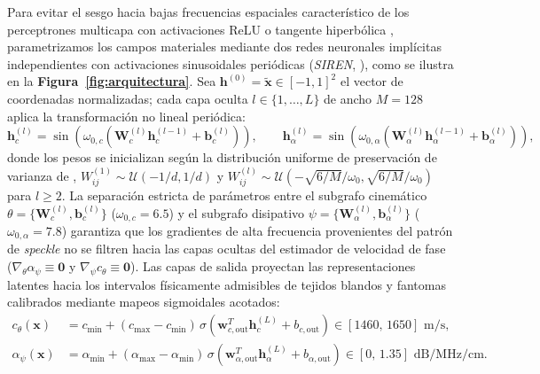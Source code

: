 \documentclass[9pt]{article}
\begin{document}
Para evitar el sesgo hacia bajas frecuencias espaciales característico de los perceptrones multicapa con activaciones ReLU o tangente hiperbólica \parencite{Tancik2020, Wang2021}, parametrizamos los campos materiales mediante dos redes neuronales implícitas independientes con activaciones sinusoidales periódicas (\textit{SIREN}, \cite{Sitzmann2020}), como se ilustra en la \textbf{Figura~\ref{fig:arquitectura}}. Sea $\mathbf{h}^{(0)} = \tilde{\mathbf{x}} \in [-1, 1]^2$ el vector de coordenadas normalizadas; cada capa oculta $l \in \{1, \dots, L\}$ de ancho $M = 128$ aplica la transformación no lineal periódica:
\begin{equation}
\mathbf{h}_c^{(l)} = \sin\!\left(\omega_{0,c}\left(\mathbf{W}_c^{(l)}\mathbf{h}_c^{(l-1)} + \mathbf{b}_c^{(l)}\right)\right), \qquad \mathbf{h}_\alpha^{(l)} = \sin\!\left(\omega_{0,\alpha}\left(\mathbf{W}_\alpha^{(l)}\mathbf{h}_\alpha^{(l-1)} + \mathbf{b}_\alpha^{(l)}\right)\right),
\label{eq:siren_layers}
\end{equation}
donde los pesos se inicializan según la distribución uniforme de preservación de varianza de \textcite{Sitzmann2020}, $W_{ij}^{(1)} \sim \mathcal{U}(-1/d, 1/d)$ y $W_{ij}^{(l)} \sim \mathcal{U}(-\sqrt{6/M}/\omega_0, \sqrt{6/M}/\omega_0)$ para $l \ge 2$. La separación estricta de parámetros entre el subgrafo cinemático $\theta = \{\mathbf{W}_c^{(l)}, \mathbf{b}_c^{(l)}\}$ ($\omega_{0,c} = 6.5$) y el subgrafo disipativo $\psi = \{\mathbf{W}_\alpha^{(l)}, \mathbf{b}_\alpha^{(l)}\}$ ($\omega_{0,\alpha} = 7.8$) garantiza que los gradientes de alta frecuencia provenientes del patrón de \textit{speckle} no se filtren hacia las capas ocultas del estimador de velocidad de fase ($\nabla_\theta \alpha_\psi \equiv \mathbf{0}$ y $\nabla_\psi c_\theta \equiv \mathbf{0}$). Las capas de salida proyectan las representaciones latentes hacia los intervalos físicamente admisibles de tejidos blandos y fantomas calibrados mediante mapeos sigmoidales acotados:
\begin{align}
c_\theta(\mathbf{x}) &= c_{\min} + (c_{\max} - c_{\min})\,\sigma\!\left(\mathbf{w}_{c,\text{out}}^T\mathbf{h}_c^{(L)} + b_{c,\text{out}}\right) \in [1460,\, 1650]\text{ m/s}, \label{eq:c_bounds}\\
\alpha_\psi(\mathbf{x}) &= \alpha_{\min} + (\alpha_{\max} - \alpha_{\min})\,\sigma\!\left(\mathbf{w}_{\alpha,\text{out}}^T\mathbf{h}_\alpha^{(L)} + b_{\alpha,\text{out}}\right) \in [0,\, 1.35]\text{ dB/MHz/cm}. \label{eq:alpha_bounds}
\end{align}
\end{document}
